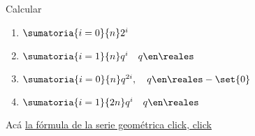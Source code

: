 \begin{enunciado}{\ejercicio}
  Calcular
  \begin{multicols}{2}
    \begin{enumerate}[label=\roman*)]
      \item $\sumatoria{i=0}{n} 2^i$
      \item $\sumatoria{i=1}{n} q^i \quad q \en \reales$
      \item $\sumatoria{i=0}{n} q^{2i}, \quad q \en \reales - \set{0}$
      \item $\sumatoria{i=1}{2n} q^i \quad q \en \reales$
    \end{enumerate}
  \end{multicols}
\end{enunciado}

Acá \hyperlink{2-teoria:geometrica}{la fórmula de la serie geométrica click, click {\tiny {}}}

